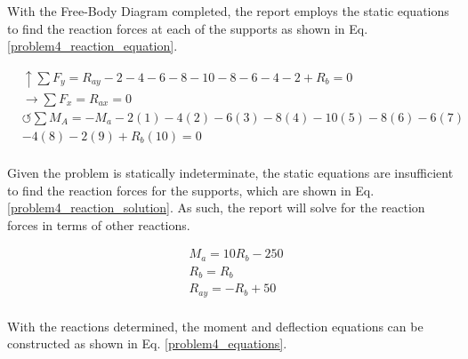 \documentclass[a4paper]{article}
\begin{document}
With the Free-Body Diagram completed, the report employs the static equations to find the reaction forces at each of the supports as shown in Eq. \ref{problem4_reaction_equation}.

\begin{equation}
\begin{split}
	&\uparrow \sum F_y = R_{ay} -2 -4 -6 -8 -10 -8 -6 -4 -2 + R_b= 0 \\
 	&\rightarrow \sum F_x = R_{ax} = 0 \\
 	&\circlearrowleft \sum M_A = -M_a -2(1) -4(2) -6(3) -8(4) -10(5) -8(6) -6(7) \\
	& - 4(8) -2(9) + R_b(10) = 0 \\
\end{split}
\label{problem4_reaction_equation}
\end{equation}

Given the problem is statically indeterminate, the static equations are insufficient to find the reaction forces for the supports, which are shown in Eq. \ref{problem4_reaction_solution}. As such, the report will solve for the reaction forces in terms of other reactions.

\begin{equation}
\begin{split}
	& M_a = 10R_b - 250 \\
	& R_{b} = R_b \\
	& R_{ay} = -R_b + 50 \\
\end{split}
\label{problem4_reaction_solution}
\end{equation}

With the reactions determined, the moment and deflection equations can be constructed as shown in Eq. \ref{problem4_equations}.
\end{document}
